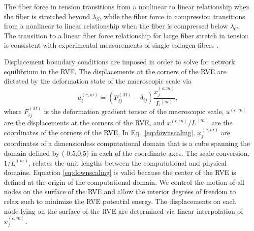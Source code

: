 \documentclass[]{interact}
\begin{document}
The fiber force in tension transitions from a nonlinear to linear relationship when the fiber is stretched beyond $\lambda_S$, while the fiber force in compression transitions from a nonlinear to linear relationship when the fiber is compressed below $\lambda_C$. The transition to a linear fiber force relationship for large fiber stretch in tension is consistent with experimental measurements of single collagen fibers \citep{Eppell:2006hh,Svensson:2010fr}. 

Displacement boundary conditions are imposed in order to solve for network equilibrium in the RVE. The displacements at the corners of the RVE are dictated by the deformation state of the macroscopic scale via
%
\begin{equation}
u^{(c,m)}_i = (F^{(M)}_{ij} - \delta_{ij}) \frac{x^{(c,m)}_j}{L^{(m)}},
\label{eq:downscaling}
\end{equation}
%
where $F^{(M)}_{ij}$ is the deformation gradient tensor of the macroscopic scale, $u^{(c,m)}$ are the displacements at the corners of the RVE,  and $x^{(c,m)}/L^{(m)}$ are the coordinates of the corners of the RVE. In Eq.\ \eqref{eq:downscaling}, $x^{(c,m)}_j$ are coordinates of a dimensionless computational domain that is a cube spanning the domain defined by (-0.5,0.5) in each of the coordinate axes. The scale conversion, $1/L^{(m)}$, relates the unit lengths between the computational and physical domains. Equation \eqref{eq:downscaling} is valid because the center of the RVE is defined at the origin of the computational domain. We control the motion of all nodes on the surface of the RVE and allow the interior degrees of freedom to relax such to minimize the RVE potential energy. The displacements on each node lying on the surface of the RVE are determined via linear interpolation of $x^{(c,m)}_j$. 
\end{document}
